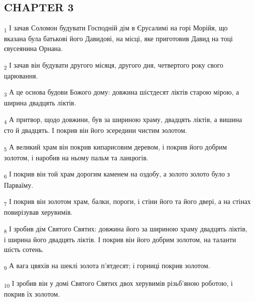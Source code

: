 \subsection{CHAPTER 3}
\begin{tcolorbox}
\textsubscript{1} І зачав Соломон будувати Господній дім в Єрусалимі на горі Морійя, що вказана була батькові його Давидові, на місці, яке приготовив Давид на тоці євусеянина Орнана.
\end{tcolorbox}
\begin{tcolorbox}
\textsubscript{2} І зачав він будувати другого місяця, другого дня, четвертого року свого царювання.
\end{tcolorbox}
\begin{tcolorbox}
\textsubscript{3} А це основа будови Божого дому: довжина шістдесят ліктів старою мірою, а ширина двадцять ліктів.
\end{tcolorbox}
\begin{tcolorbox}
\textsubscript{4} А притвор, щодо довжини, був за шириною храму, двадцять ліктів, а вишина сто й двадцять. І покрив він його зсередини чистим золотом.
\end{tcolorbox}
\begin{tcolorbox}
\textsubscript{5} А великий храм він покрив кипарисовим деревом, і покрив його добрим золотом, і наробив на ньому пальм та ланцюгів.
\end{tcolorbox}
\begin{tcolorbox}
\textsubscript{6} І покрив він той храм дорогим каменем на оздобу, а золото золото було з Парваїму.
\end{tcolorbox}
\begin{tcolorbox}
\textsubscript{7} І покрив він золотом храм, балки, пороги, і стіни його та його двері, а на стінах повирізував херувимів.
\end{tcolorbox}
\begin{tcolorbox}
\textsubscript{8} І зробив дім Святого Святих: довжина його за шириною храму двадцять ліктів, і ширина його двадцять ліктів. І покрив він його добрим золотом, на таланти шість сотень.
\end{tcolorbox}
\begin{tcolorbox}
\textsubscript{9} А вага цвяхів на шеклі золота п'ятдесят; і горниці покрив золотом.
\end{tcolorbox}
\begin{tcolorbox}
\textsubscript{10} І зробив він у домі Святого Святих двох херувимів різьб'яною роботою, і покрив їх золотом.
\end{tcolorbox}
